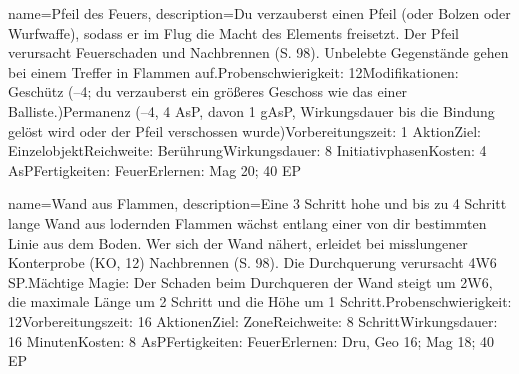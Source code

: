 {
    name={Pfeil des Feuers},
    description={Du verzauberst einen Pfeil (oder Bolzen oder Wurfwaffe), sodass er im Flug die Macht des Elements freisetzt. Der Pfeil verursacht Feuerschaden und Nachbrennen (S. 98). Unbelebte Gegenstände gehen bei einem Treffer in Flammen auf.\newline Probenschwierigkeit: 12\newline Modifikationen: Geschütz (–4; du verzauberst ein größeres Geschoss wie das einer Balliste.)\newline Permanenz (–4, 4 AsP, davon 1 gAsP, Wirkungsdauer bis die Bindung gelöst wird oder der Pfeil verschossen wurde)\newline Vorbereitungszeit: 1 Aktion\newline Ziel: Einzelobjekt\newline Reichweite: Berührung\newline Wirkungsdauer: 8 Initiativphasen\newline Kosten: 4 AsP\newline Fertigkeiten: Feuer\newline Erlernen: Mag 20; 40 EP}
}


{
    name={Wand aus Flammen},
    description={Eine 3 Schritt hohe und bis zu 4 Schritt lange Wand aus lodernden Flammen wächst entlang einer von dir bestimmten Linie aus dem Boden. Wer sich der Wand nähert, erleidet bei misslungener Konterprobe (KO, 12) Nachbrennen (S. 98). Die Durchquerung verursacht 4W6 SP.\newline Mächtige Magie: Der Schaden beim Durchqueren der Wand steigt um 2W6, die maximale Länge um 2 Schritt und die Höhe um 1 Schritt.\newline Probenschwierigkeit: 12\newline Vorbereitungszeit: 16 Aktionen\newline Ziel: Zone\newline Reichweite: 8 Schritt\newline Wirkungsdauer: 16 Minuten\newline Kosten: 8 AsP\newline Fertigkeiten: Feuer\newline Erlernen: Dru, Geo 16; Mag 18; 40 EP}
}


